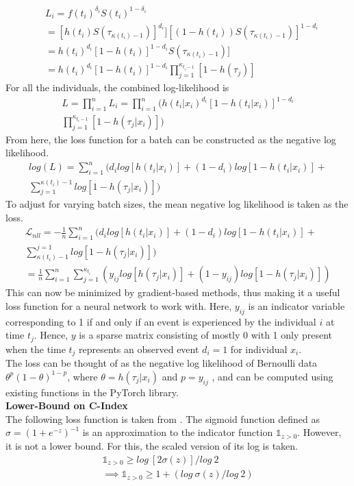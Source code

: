 \documentclass[%
 reprint,
 amsmath,amssymb,
 aps,nofootinbib
]{revtex4-2}
\begin{document}
\begin{align*}
&L_i = f(t_i)^{\delta_i}S(t_i)^{1-\delta_i}\\
&= [h(t_i)S(\tau_{\kappa(t_i)-1})]^{d_i}][(1-h(t_i))S(\tau_{\kappa(t_i)-1})]^{1-d_i}\\
&= h(t_i)^{d_i}[1 - h(t_i)]^{1-d_i}S(\tau_{\kappa(t_i)-1})]\\
&= h(t_i)^{d_i}[1 - h(t_i)]^{1-d_i} \prod^{\kappa_{t_i-1}}_{j=1}[1 - h(\tau_j)]
\end{align*}
For all the individuals, the combined log-likelihood is
\begin{align*}
L = \prod^{n}_{i=1}L_i = \prod^{n}_{i=1}\Bigg(h(t_i|x_i)^{d_i}[1 - h(t_i|x_i)]^{1-d_i} \\
\prod^{\kappa_{t_i-1}}_{j=1}[1 - h(\tau_j|x_i)]\Bigg)
\end{align*}
From here, the loss function for a batch can be constructed as the negative log likelihood.
\begin{align*}
log(L) = \sum^{n}_{i=1}\Bigg(d_i log[h(t_i|x_i)]+(1-d_i)log[1-h(t_i|x_i)]+\\
\sum^{\kappa(t_i)-1}_{j=1}log[1 - h(\tau_j|x_i)] \Bigg)
\end{align*}
To adjust for varying batch sizes, the mean negative log likelihood is taken as the loss.
\begin{align*}
\mathcal{L}_{nll} = -\frac{1}{n}\sum^{n}_{i=1}\Bigg(d_i log[h(t_i|x_i)]+(1-d_i)log[1-h(t_i|x_i)]+\\
\sum^{j=1}_{\kappa(t_i)-1}log[1 - h(\tau_j|x_i)] \Bigg) \\
= \frac{1}{n}\sum^{n}_{i=1}\sum^{\kappa_{t_i}}_{j=1}(y_{ij}log[h(\tau_j|x_i)]+(1-y_{ij})log[1-h(\tau_j|x_i)])
\end{align*}
This can now be minimized by gradient-based methods, thus making it a useful loss function for a neural network to work with. Here, $y_{ij}$ is an indicator variable corresponding to 1 if and only if an event is experienced by the individual $i$ at time $t_j$. Hence, $y$ is a sparse matrix consisting of mostly 0 with 1 only present when the time $t_j$ represents an observed event $d_i = 1$ for individual $x_i$. \\

The loss can be thought of as the negative log likelihood of Bernoulli data $\theta^p(1-\theta)^{1-p}$, where $\theta=h(\tau_j|x_i)$ and $p=y_{ij}$ \cite{bin_x_entropy_brown}, and can be computed using existing functions in the PyTorch library.\\

\textbf{Lower-Bound on C-Index}\\
The following loss function is taken from \cite{raykar_cindex}. The sigmoid function defined as $\sigma = (1 + e^{-z})^{-1}$ is an approximation to the indicator function $\mathds{1}_{z>0}$. However, it is not a lower bound. For this, the scaled version of its log is taken.
\begin{gather*}
\mathds{1}_{z>0} \ge log\ [2\sigma(z)]/log\ 2\\
\implies \mathds{1}_{z>0} \ge 1 + (log\ \sigma(z)/log\ 2)
\end{gather*}
\end{document}
